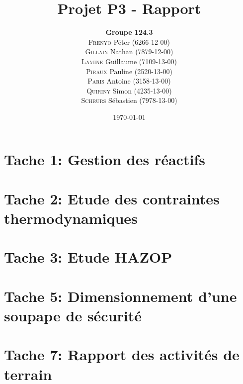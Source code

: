 \documentclass{report}
\title{Projet P3 - Rapport}
\author{\textbf{Groupe 124.3}\\
\textsc{Frenyo} Péter (6266-12-00)\\
\textsc{Gillain} Nathan (7879-12-00)\\
\textsc{Lamine} Guillaume (7109-13-00)\\
\textsc{Piraux} Pauline (2520-13-00)\\
\textsc{Paris} Antoine (3158-13-00)\\
\textsc{Quiriny} Simon (4235-13-00)\\
\textsc{Schrurs} Sébastien (7978-13-00)}
\date{\today}
\begin{document}
\maketitle
\tableofcontents

\chapter{Tache 1: Gestion des réactifs}

\chapter{Tache 2: Etude des contraintes thermodynamiques}

\chapter{Tache 3: Etude HAZOP}

\chapter{Tache 5: Dimensionnement d'une soupape de sécurité}

\chapter{Tache 7: Rapport des activités de terrain}




\nocite{*}
\end{document}
